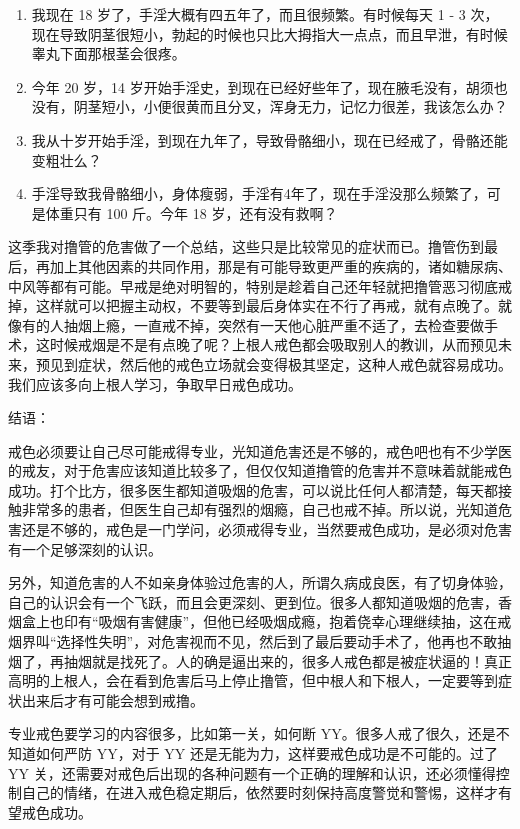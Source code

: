 \documentclass[fontset=founder]{ctexart}
\begin{document}
\begin{enumerate}
    \item 我现在 18 岁了，手淫大概有四五年了，而且很频繁。有时候每天 1 - 3 次，现在导致阴茎很短小，勃起的时候也只比大拇指大一点点，而且早泄，有时候睾丸下面那根茎会很疼。
    \item 今年 20 岁，14 岁开始手淫史，到现在已经好些年了，现在腋毛没有，胡须也没有，阴茎短小，小便很黄而且分叉，浑身无力，记忆力很差，我该怎么办？
    \item 我从十岁开始手淫，到现在九年了，导致骨骼细小，现在已经戒了，骨骼还能变粗壮么？
    \item 手淫导致我骨骼细小，身体瘦弱，手淫有4年了，现在手淫没那么频繁了，可是体重只有 100 斤。今年 18 岁，还有没有救啊？
\end{enumerate}

这季我对撸管的危害做了一个总结，这些只是比较常见的症状而已。撸管伤到最后，再加上其他因素的共同作用，那是有可能导致更严重的疾病的，诸如糖尿病、中风等都有可能。早戒是绝对明智的，特别是趁着自己还年轻就把撸管恶习彻底戒掉，这样就可以把握主动权，不要等到最后身体实在不行了再戒，就有点晚了。就像有的人抽烟上瘾，一直戒不掉，突然有一天他心脏严重不适了，去检查要做手术，这时候戒烟是不是有点晚了呢？上根人戒色都会吸取别人的教训，从而预见未来，预见到症状，然后他的戒色立场就会变得极其坚定，这种人戒色就容易成功。我们应该多向上根人学习，争取早日戒色成功。

结语：

戒色必须要让自己尽可能戒得专业，光知道危害还是不够的，戒色吧也有不少学医的戒友，对于危害应该知道比较多了，但仅仅知道撸管的危害并不意味着就能戒色成功。打个比方，很多医生都知道吸烟的危害，可以说比任何人都清楚，每天都接触非常多的患者，但医生自己却有强烈的烟瘾，自己也戒不掉。所以说，光知道危害还是不够的，戒色是一门学问，必须戒得专业，当然要戒色成功，是必须对危害有一个足够深刻的认识。

另外，知道危害的人不如亲身体验过危害的人，所谓久病成良医，有了切身体验，自己的认识会有一个飞跃，而且会更深刻、更到位。很多人都知道吸烟的危害，香烟盒上也印有“吸烟有害健康”，但他已经吸烟成瘾，抱着侥幸心理继续抽，这在戒烟界叫“选择性失明”，对危害视而不见，然后到了最后要动手术了，他再也不敢抽烟了，再抽烟就是找死了。人的确是逼出来的，很多人戒色都是被症状逼的！真正高明的上根人，会在看到危害后马上停止撸管，但中根人和下根人，一定要等到症状出来后才有可能会想到戒撸。

专业戒色要学习的内容很多，比如第一关，如何断 YY。很多人戒了很久，还是不知道如何严防 YY，对于 YY 还是无能为力，这样要戒色成功是不可能的。过了 YY 关，还需要对戒色后出现的各种问题有一个正确的理解和认识，还必须懂得控制自己的情绪，在进入戒色稳定期后，依然要时刻保持高度警觉和警惕，这样才有望戒色成功。
\end{document}
